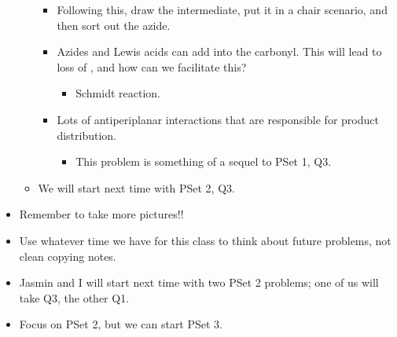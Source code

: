 \documentclass[../notes.tex]{subfiles}
\begin{document}
\begin{itemize}
\begin{itemize}
\begin{itemize}
            \item Following this, draw the intermediate, put it in a chair scenario, and then sort out the azide.
            \item Azides and Lewis acids can add into the carbonyl. This will lead to loss of , and how can we facilitate this?
            \begin{itemize}
                \item Schmidt reaction.
            \end{itemize}
            \item Lots of antiperiplanar interactions that are responsible for product distribution.
            \begin{itemize}
                \item This problem is something of a sequel to PSet 1, Q3.
            \end{itemize}
        \end{itemize}
        \item We will start next time with PSet 2, Q3.
    \end{itemize}
    \item Remember to take more pictures!!
    \item Use whatever time we have for this class to think about future problems, not clean copying notes.
    \item Jasmin and I will start next time with two PSet 2 problems; one of us will take Q3, the other Q1.
    \item Focus on PSet 2, but we can start PSet 3.
\end{itemize}
\end{document}
